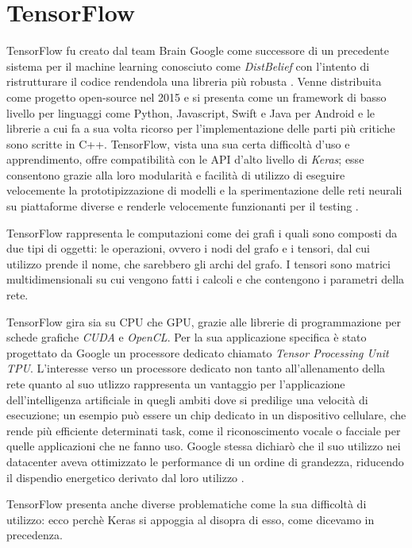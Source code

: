 \section{TensorFlow}
TensorFlow  fu creato dal team Brain Google come successore di un precedente sistema per il machine learning conosciuto come \textit{DistBelief} con l'intento di ristrutturare il codice rendendola una libreria più robusta \cite{wiki:tf}. Venne distribuita come progetto open-source nel 2015 e si presenta come un framework di basso livello \cite{oreilly:pytorch_intro} per linguaggi come Python, Javascript, Swift e Java per Android  e le librerie a cui fa a sua volta ricorso per l'implementazione delle parti più critiche sono scritte in C++. TensorFlow, vista una sua certa difficoltà d'uso e apprendimento, offre compatibilità con le API d'alto livello di \textit{Keras}; esse consentono grazie alla loro modularità e facilità di utilizzo di eseguire velocemente la prototipizzazione di modelli e la sperimentazione delle reti neurali su piattaforme diverse e renderle velocemente funzionanti per il testing \cite{keras}.

TensorFlow rappresenta le computazioni come dei grafi i quali sono composti da due tipi di oggetti: le operazioni, ovvero i nodi del grafo e i tensori, dal cui utilizzo prende il nome, che sarebbero gli archi del grafo.
I tensori sono matrici multidimensionali su cui vengono fatti i calcoli e che contengono i parametri della rete.

TensorFlow gira sia su CPU che GPU, grazie alle librerie di programmazione per schede grafiche \textit{CUDA} e \textit{OpenCL}. Per la sua applicazione specifica è stato progettato da Google un processore dedicato chiamato \emph{Tensor Processing Unit} \textit{TPU}. L'interesse verso un processore dedicato non tanto all'allenamento della rete quanto al suo utlizzo rappresenta un vantaggio per l'applicazione dell'intelligenza artificiale in quegli ambiti dove si predilige una velocità di esecuzione; un esempio può essere un chip dedicato in un dispositivo cellulare, che rende più efficiente determinati task, come il riconoscimento vocale o facciale per quelle applicazioni che ne fanno uso. Google stessa dichiarò che il suo utilizzo nei datacenter aveva ottimizzato le performance di un ordine di grandezza, riducendo il dispendio energetico derivato dal loro utilizzo \cite{gao2014machine}. 

TensorFlow presenta anche diverse problematiche come la sua difficoltà di utilizzo: ecco perchè Keras si appoggia al disopra di esso, come dicevamo in precedenza.


